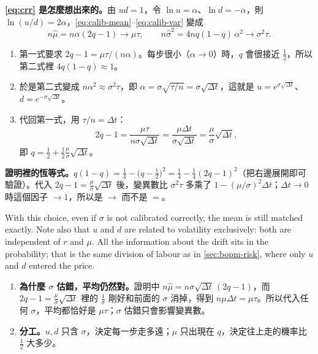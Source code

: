 \begin{remark}[補充]
	\textbf{\eqref{eq:crr} 是怎麼想出來的。}由 $ud=1$，令 $\ln u=\alpha$、$\ln d=-\alpha$，則 $\ln(u/d)=2\alpha$，\eqref{eq:calib-mean}--\eqref{eq:calib-var} 變成
	\[
		n\hat{\mu}=n\alpha(2q-1)\to\mu\tau ,
		\qquad
		n\hat{\sigma}^{2}=4nq(1-q)\,\alpha^{2}\to\sigma^{2}\tau .
	\]
	\begin{enumerate}[(1),nosep]
		\item 第一式要求 $2q-1=\mu\tau/(n\alpha)$。每步很小（$\alpha\to0$）時，$q$ 會很接近 $\frac12$，所以第二式裡 $4q(1-q)\approx1$。
		\item 於是第二式變成 $n\alpha^{2}\approx\sigma^{2}\tau$，即 $\alpha=\sigma\sqrt{\tau/n}=\sigma\sqrt{\Delta t}$，這就是 $u=e^{\sigma\sqrt{\Delta t}}$、$d=e^{-\sigma\sqrt{\Delta t}}$。
		\item 代回第一式，用 $\tau/n=\Delta t$：
		\[
			2q-1=\frac{\mu\tau}{n\sigma\sqrt{\Delta t}}=\frac{\mu\Delta t}{\sigma\sqrt{\Delta t}}=\frac{\mu}{\sigma}\sqrt{\Delta t} ,
		\]
		即 $q=\frac12+\frac12\frac{\mu}{\sigma}\sqrt{\Delta t}$。
	\end{enumerate}
	\textbf{證明裡的恆等式。}$q(1-q)=\frac14-\bigl(q-\frac12\bigr)^{2}=\frac14-\frac14(2q-1)^{2}$（把右邊展開即可驗證）。代入 $2q-1=\frac{\mu}{\sigma}\sqrt{\Delta t}$ 後，變異數比 $\sigma^{2}\tau$ 多乘了 $1-(\mu/\sigma)^{2}\Delta t$；$\Delta t\to0$ 時這個因子 $\to1$，所以是 $\to$ 而不是 $=$。
\end{remark}
\suppend

With this choice, even if $\sigma$ is not calibrated correctly, the mean is still matched exactly.
Note also that $u$ and $d$ are related to volatility exclusively: both are independent of $r$ and $\mu$.
\suppstart
All the information about the drift sits in the probability; that is the same division of labour as in \autoref{sec:bopm-risk}, where only $u$ and $d$ entered the price.

\begin{remark}
	\begin{enumerate}[(1),nosep]
		\item \textbf{為什麼 $\sigma$ 估錯，平均仍然對。}證明中 $n\hat{\mu}=n\sigma\sqrt{\Delta t}\,(2q-1)$，而 $2q-1=\frac{\mu}{\sigma}\sqrt{\Delta t}$ 裡的 $\frac1\sigma$ 剛好和前面的 $\sigma$ 消掉，得到 $n\mu\Delta t=\mu\tau$。所以代入任何 $\sigma$，平均都恰好是 $\mu\tau$；$\sigma$ 估錯只會影響變異數。
		\item \textbf{分工。}$u,d$ 只含 $\sigma$，決定每一步走多遠；$\mu$ 只出現在 $q$，決定往上走的機率比 $\frac12$ 大多少。
	\end{enumerate}
\end{remark}
\suppend

